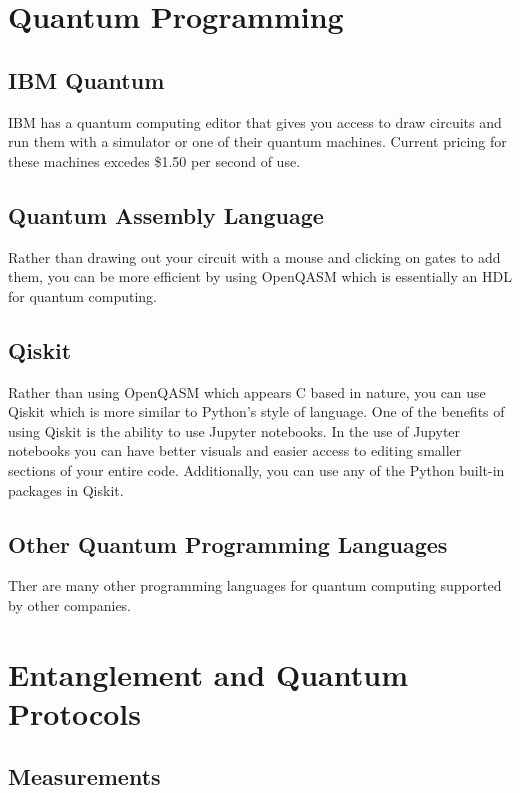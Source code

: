 \documentclass{article}
\begin{document}
\section{Quantum Programming} %

\subsection{IBM Quantum}

IBM has a quantum computing editor that gives you access to draw circuits and run them with a simulator or one of their quantum machines. Current pricing for these machines excedes \$1.50 per second of use.  

\subsection{Quantum Assembly Language}

Rather than drawing out your circuit with a mouse and clicking on gates to add them, you can be more efficient by using OpenQASM which is essentially an HDL for quantum computing. 

\subsection{Qiskit}

Rather than using OpenQASM which appears C based in nature, you can use Qiskit which is more similar to Python's style of language. One of the benefits of using Qiskit is the ability to use Jupyter notebooks. In the use of Jupyter notebooks you can have better visuals and easier access to editing smaller sections of your entire code. Additionally, you can use any of the Python built-in packages in Qiskit.

\subsection{Other Quantum Programming Languages}

Ther are many other programming languages for quantum computing supported by other companies.

\section{Entanglement and Quantum Protocols} %

\subsection{Measurements}
\end{document}
